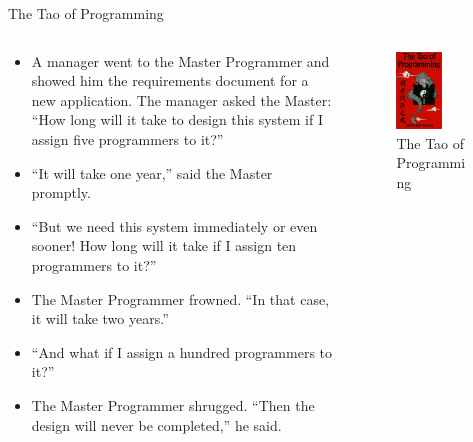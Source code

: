 \documentclass{beamer}
\begin{document}
\begin{frame}[t]{The Tao of Programming}
\begin{columns}
    \begin{column}{0.6\textwidth}
        \scriptsize
        \begin{itemize}
            \item A manager went to the Master Programmer and showed him the requirements document for a new application. The manager asked the Master: ``How long will it take to design this system if I assign five programmers to it?''
            \item ``It will take one year,'' said the Master promptly.
            \item ``But we need this system immediately or even sooner! How long will it take if I assign ten programmers to it?''
            \item The Master Programmer frowned. ``In that case, it will take two years.''
            \item ``And what if I assign a hundred programmers to it?''
            \item The Master Programmer shrugged. ``Then the design will never be completed,'' he said.
        \end{itemize}
    \end{column}
    \begin{column}{0.4\textwidth}
        \begin{figure}
            \includegraphics[width=0.6\textwidth]{images/tao.jpg}
            \caption{The Tao of Programming}
        \end{figure}
    \end{column}
\end{columns}
\end{frame}
\end{document}

